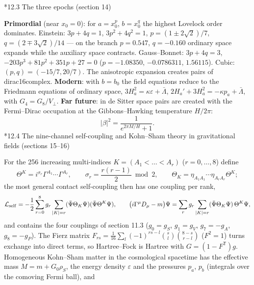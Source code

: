 \documentclass[10pt,a4paper]{article}
\makeatletter
\renewcommand\subsection{\@startsection{subsection}{2}{\z@}{-3.25ex\@plus -1ex \@minus -.2ex}{1.5ex \@plus .2ex}{\normalfont\large\bfseries\raggedright}}
\makeatother
\begin{document}
\subsection*{12.3 The three epochs (section 14)}
\textbf{Primordial} (near $x_0=0$): for $a=x_0^p$, $b=x_0^q$ the highest Lovelock order dominates. Einstein: $3p+4q=1$, $3p^2+4q^2=1$, $p=(1\pm2\sqrt2)/7$, $q=(2\mp3\sqrt2)/14$ — on the branch $p=0.547$, $q=-0.160$ ordinary space expands while the auxiliary space contracts. Gauss–Bonnet: $3p+4q=3$, $-203p^3+81p^2+351p+27=0$ ($p=-1.08350$, $-0.0786311$, $1.56115$). Cubic: $(p,q)=(-15/7,20/7)$. The anisotropic expansion creates pairs of dirac16complex. \textbf{Modern}: with $b=b_0$ the field equations reduce to the Friedmann equations of ordinary space, $3H_a^2=\kappa\varepsilon+\bar\Lambda$, $2H_a'+3H_a^2=-\kappa p_a+\bar\Lambda$, with $G_4=G_8/V_\perp$. \textbf{Far future}: in de Sitter space pairs are created with the Fermi–Dirac occupation at the Gibbons–Hawking temperature $H/2\pi$:
\begin{equation*}
|\beta|^2=\frac{1}{e^{2\pi M/H}+1}.
\end{equation*}
\subsection*{12.4 The nine-channel self-coupling and Kohn–Sham theory in gravitational fields (sections 15–16)}
For the 256 increasing multi-indices $K=(A_1<\dots<A_r)$ ($r=0,\dots,8$) define
\begin{equation*}
\Theta^K=i^{\sigma_r}\Gamma^{A_1}\cdots\Gamma^{A_r},\qquad \sigma_r=\frac{r(r-1)}2\bmod2,\qquad \Theta_K=\eta_{A_1A_1}\cdots\eta_{A_rA_r}\Theta^K;
\end{equation*}
the most general contact self-coupling then has one coupling per rank,
\begin{equation*}
\mathcal L_{\rm self}=-\frac12\sum_{r=0}^{8}g_r\sum_{|K|=r}(\bar\Psi\Theta_K\Psi)(\bar\Psi\Theta^K\Psi),\qquad \big(i\Gamma^\mu D_\mu-m\big)\Psi=\sum_rg_r\sum_{|K|=r}(\bar\Psi\Theta_K\Psi)\,\Theta^K\Psi,
\end{equation*}
and contains the four couplings of section 11.3 ($g_0=g_S$, $g_1=g_V$, $g_7=-g_A$, $g_8=-g_P$). The Fierz matrix $F_{rs}=\frac1{16}\sum_l(-1)^{rs-l}\binom sl\binom{8-s}{r-l}$ ($F^2=1$) turns exchange into direct terms, so Hartree–Fock is Hartree with $G=(1-F^{\mathsf T})g$. Homogeneous Kohn–Sham matter in the cosmological spacetime has the effective mass $M=m+G_0\rho_S$, the energy density $\varepsilon$ and the pressures $p_a$, $p_b$ (integrals over the comoving Fermi ball), and
\end{document}
